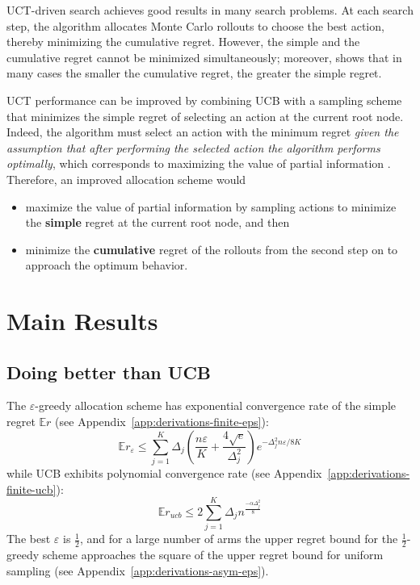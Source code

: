 \documentclass{article}
\newcommand {\IE} {\ensuremath {\mathbb{E}}}
\begin{document}
UCT-driven search achieves good results in many search problems. At each
search step, the algorithm allocates Monte Carlo rollouts to choose
the best action, thereby minimizing the cumulative regret. However, the
simple and the cumulative regret cannot be minimized simultaneously;
moreover, \cite{Bubeck.pure} shows that in many cases the smaller the
cumulative regret, the greater the simple regret.

UCT performance can be improved by combining UCB with a sampling
scheme that minimizes the simple regret of selecting an action at the
current root node. Indeed, the algorithm must select an action with
the minimum regret \emph{given the assumption that after performing the selected action
the algorithm performs optimally}, which corresponds to maximizing the
value of partial information \cite{Russell.aima}. Therefore, an
improved allocation scheme would
\begin{itemize}
\item maximize the value of partial
information by sampling actions to minimize the \textbf{simple} regret at the
current root node, and then 
\item minimize the \textbf{cumulative} regret of the rollouts from the second
  step on to approach the optimum behavior. 
\end{itemize}


\section{Main Results}

\subsection{Doing better than UCB}

The $\varepsilon$-greedy allocation scheme has exponential convergence
rate of the simple regret $\IE r$ (see Appendix~\ref{app:derivations-finite-eps}):
\begin{equation}
  \IE r_\varepsilon\le\sum_{j=1}^K\Delta_j\left(\frac {n\varepsilon} K + \frac {4\sqrt e}
{\Delta_j^2}\right)e^{-\Delta_j^2n\varepsilon/8K}
\end{equation}
while UCB exhibits polynomial convergence
rate (see Appendix~\ref{app:derivations-finite-ucb}):
\begin{equation}
\IE r_{ucb} \le 2\sum_{j=1}^K \Delta_jn^{\frac {-\alpha \Delta_j^2} 8}
\end{equation}
The best $\varepsilon$ is $\frac 1 2$, and for a large number of arms
the upper regret bound for the $\frac 1 2$-greedy scheme approaches the square of the
upper regret bound for uniform sampling (see
Appendix~\ref{app:derivations-asym-eps}).
\end{document}
